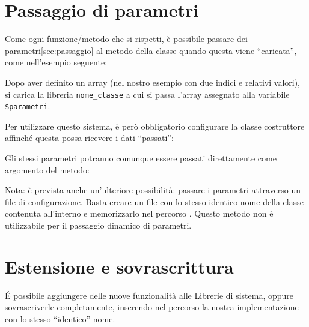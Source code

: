 \section{Passaggio di parametri}
Come ogni funzione/metodo che si rispetti, è possibile passare dei parametri\vref{sec:passaggio} al metodo della classe quando questa viene ``caricata'', come nell'esempio seguente:


Dopo aver definito un array (nel nostro esempio con due indici e relativi valori), si carica la libreria \verb|nome_classe| a cui si passa l'array assegnato alla variabile \verb|$parametri|.

Per utilizzare questo sistema, è però obbligatorio configurare la classe costruttore affinché questa possa ricevere i dati ``passati'':


Gli stessi parametri potranno comunque essere passati direttamente come argomento del metodo:


Nota: è prevista anche un'ulteriore possibilità: passare i parametri attraverso un file di configurazione. Basta creare un file con lo stesso identico nome della classe contenuta all'interno e memorizzarlo nel percorso . Questo metodo non è utilizzabile per il passaggio dinamico di parametri.

\section{Estensione e sovrascrittura}
\'E possibile aggiungere delle nuove funzionalità alle Librerie di sistema, oppure sovrascriverle completamente, inserendo nel percorso  la nostra implementazione con lo stesso ``identico'' nome.

